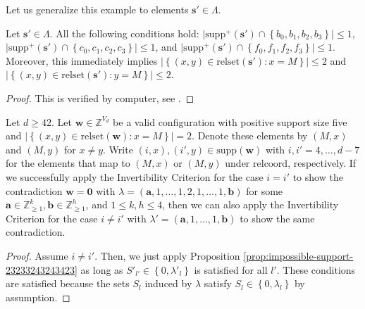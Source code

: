 Let us generalize this example to elements \(  \mathbf{s}' \in \Lambda \).

\begin{proposition}
    Let \( \mathbf{s}' \in \Lambda \). All the following conditions hold: \( \lvert \mathrm{supp}^+(\mathbf{s}') \cap \left\{ b_0,b_1,b_2,b_3 \right\} \rvert \leq 1 \), \( \lvert \mathrm{supp}^+(\mathbf{s}') \cap \left\{ c_0,c_1,c_2,c_3 \right\} \rvert \leq 1 \), and \( \lvert \mathrm{supp}^+(\mathbf{s}') \cap \left\{ f_0,f_1,f_2,f_3 \right\} \rvert \leq 1 \). Moreover, this immediately implies \( \lvert \left\{ (x,y) \in \mathrm{relset}(\mathbf{s}') : x = M \right\} \rvert \leq 2 \) and \(  \lvert \left\{ (x,y) \in \mathrm{relset}(\mathbf{s}') : y = M \right\} \rvert \leq 2 \).
\end{proposition}

\begin{proof}
    This is verified by computer, see \cite{ducrepo}.
\end{proof}

\begin{proposition}
    Let \( d\geq 42 \).
    Let \( \mathbf{w} \in \mathbb{Z}^{V_d} \) be a valid configuration with positive support size five and \( \lvert \left\{ (x,y) \in \mathrm{relset}(\mathbf{w}) : x = M \right\} \rvert = 2 \).
    Denote these elements by \( (M, x) \) and \( (M, y) \) for \( x \neq y \). Write \( (i,x), (i',y) \in \mathrm{supp}(\mathbf{w}) \) with \( i,i' = 4, \dots, d-7 \) for the elements that map to \( (M, x) \) or \( (M, y) \) under \( \mathrm{relcoord} \), respectively. If we successfully apply the Invertibility Criterion for the case \( i = i' \) to show the contradiction \( \mathbf{w} = \mathbf 0 \) with \( \lambda = (\mathbf{a},1,\dots,1, 2, 1, \dots, 1, \mathbf{b}) \)
    for some \(\mathbf{a} \in \mathbb{Z}^{k}_{\geq 1}, \mathbf{b} \in \mathbb{Z}^{h}_{\geq 1} \), and \( 1 \leq k,h \leq 4 \), then we can also apply the Invertibility Criterion for the case \( i \neq i' \) with \( \lambda' = (\mathbf{a},1, \dots, 1, \mathbf{b}) \)
    to show the same contradiction.
\end{proposition}

\begin{proof}
    Assume \( i \neq i' \). Then, we just apply Proposition \ref{prop:impossible-support-23233243243423} as long as \( S'_{l'} \in \left\{ 0, \lambda'_l \right\} \) is satisfied for all \( l' \). These conditions are satisfied because the sets \( S_l \) induced by \( \lambda \) satisfy \( S_{l} \in \left\{ 0, \lambda_l \right\} \) by assumption.
\end{proof}

